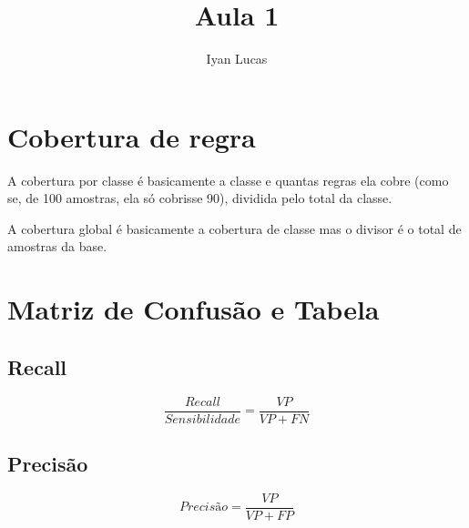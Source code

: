 \documentclass[oneside]{article}            %
\title{Aula 1}
\author{Iyan Lucas}
\begin{document}
    \maketitle

\section{Cobertura de regra}

A cobertura por classe é basicamente a classe e quantas regras ela cobre (como se, de 100 amostras, ela só cobrisse 90), dividida pelo total da classe. 

A cobertura global é basicamente a cobertura de classe mas o divisor é o total de amostras da base.

\section{Matriz de Confusão e Tabela}

\subsection{Recall}
\begin{equation}
    \displaystyle\frac{Recall}{Sensibilidade} = \frac{VP}{VP+FN}
\end{equation}
\subsection{Precisão}

\begin{equation}
    Precisão = \frac{VP}{VP+FP}
\end{equation}
\end{document}
